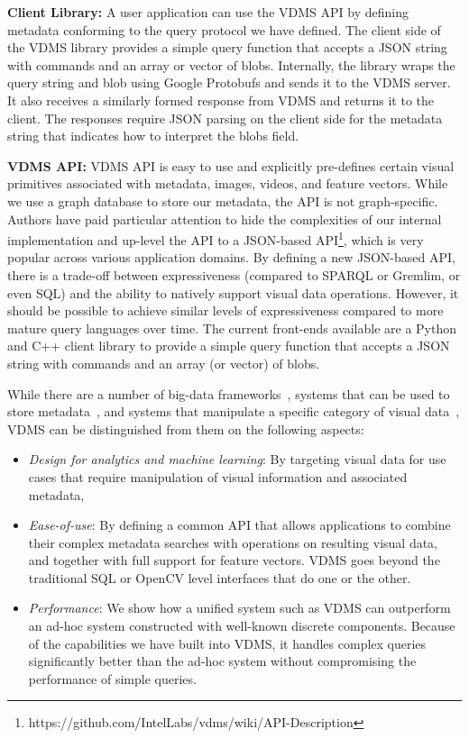 \textbf{Client Library:}
A user application can use the VDMS API by defining metadata conforming to the
query protocol we have defined.
The client side of the VDMS library provides a simple query function that
accepts a JSON string with commands and an array or vector of blobs.
Internally, the library wraps the query string and blob using
Google Protobufs \cite{protobufs} and sends it to the VDMS server.
It also receives a similarly formed response from VDMS
and returns it to the client. The responses require JSON parsing on the client
side for the metadata string that indicates how to interpret the blobs field.

\textbf{VDMS API:}
VDMS API is easy to use and explicitly pre-defines certain
visual primitives associated with metadata, images, videos, and feature vectors.
While we use a graph database to store our metadata,
the API is not graph-specific.
Authors have paid particular attention to hide the complexities of our internal
implementation and up-level the API to a JSON-based
API\footnote{https://github.com/IntelLabs/vdms/wiki/API-Description},
which is very popular across various application domains.
By defining a new JSON-based API, there is a trade-off between
expressiveness (compared to SPARQL or Gremlim, or even SQL) and
the ability to natively support visual data operations.
However, it should be possible to achieve similar levels of
expressiveness compared to more mature query languages over time.
The current front-ends available are a Python and C++ client
library to provide a simple query function that accepts a JSON string with
commands and an array (or vector) of blobs.

While there are a number of big-data frameworks~\cite{spark, hadoop}, systems
that can be used to store metadata~\cite{memsql, vertica}, and systems that
manipulate a specific category of visual data~\cite{scidb, rasdaman}, VDMS can
be distinguished from them on the following aspects:

\begin{itemize}
\item {\em Design for analytics and machine learning}: By targeting
visual data for use cases that require manipulation
of visual information and associated metadata,
\item {\em Ease-of-use}: By defining a common API that allows applications to
combine their complex metadata searches with operations on resulting visual
data, and together with full support for feature vectors. VDMS goes beyond the
traditional SQL or OpenCV level interfaces that do one or the other.
\item {\em Performance}: We show how a unified system such as VDMS can
outperform an ad-hoc system constructed with well-known discrete components.
Because of the capabilities we have built into VDMS, it handles complex
queries significantly better than the ad-hoc system without compromising the
performance of simple queries.
\end{itemize}

